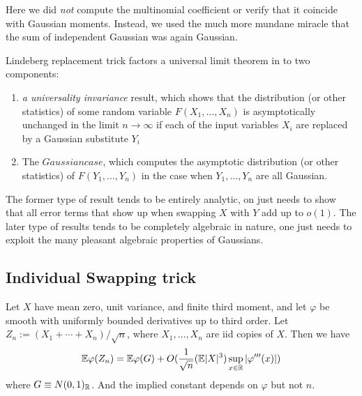 Here we did \textit{not} compute the multinomial coefficient or verify that it coincide with Gaussian moments. Instead, we used the much more mundane miracle that the sum of independent Gaussian was again Gaussian.

\begin{remark}
Lindeberg replacement trick factors a universal limit theorem in to two components:
\begin{enumerate}
    \item \textit{a universality invariance} result, which shows that the distribution (or other statistics) of some random variable $F(X_1,\dots,X_n)$ is asymptotically unchanged in the limit $n\to \infty$ if each of the input variables $X_i$ are replaced by a Gaussian substitute $Y_i$
    \item The $Gaussian case$, which computes the asymptotic distribution (or other statistics) of $F(Y_1,\dots,Y_n)$ in the case when $Y_1,\dots,Y_n$ are all Gaussian.
\end{enumerate}

The former type of result tends to be entirely analytic, on just needs to show that all error terms that show up when swapping $X$ with $Y$ add up to $o(1)$. The later type of results tends to be completely algebraic in nature, one just needs to exploit the many pleasant algebraic properties of Gaussians.
\end{remark}

\subsection{Individual Swapping trick}

\begin{theorem}
    Let $X$ have mean zero, unit variance, and finite third moment, and let $\varphi $ be smooth with uniformly bounded derivatives up to third order. Let $Z_n:=(X_1+\cdots+X_n)/\sqrt{n}$, where $X_1,\dots,X_n$ are iid copies of $X$. Then we have 
    \begin{equation}
        \label{Berry-Esseen theorem weak form}
        \mathbb{E} \varphi(Z_n) = \mathbb{E} \varphi (G) + O(\frac{1}{\sqrt{n}}(\mathbb{E} |X|^3)\sup_{x\in\mathbb{R}}|\varphi'''(x)|)
    \end{equation}
    where $G\equiv N(0,1)_{\mathbb{R}}$. And the implied constant depends on $\varphi$ but not $n$.
\end{theorem}

